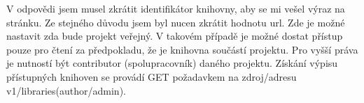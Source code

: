 \par V odpovědi jsem musel zkrátit identifikátor knihovny, aby se mi vešel výraz na stránku. Ze stejného důvodu jsem byl nucen zkrátit hodnotu url. Zde je možné nastavit zda bude projekt veřejný. V takovém případě je možné dostat přístup pouze pro čtení za předpokladu, že je knihovna součástí projektu. Pro vyšší práva je nutností být contributor (spolupracovník) daného projektu. Získání výpisu přístupných knihoven se provádí GET požadavkem na zdroj/adresu v1/libraries(author/admin).